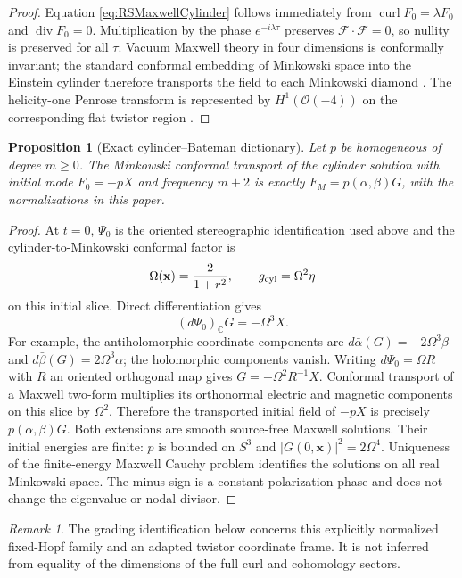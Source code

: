 \documentclass[aps,prd,reprint,nofootinbib,superscriptaddress]{revtex4-2}
\newtheorem{proposition}[theorem]{Proposition}
\theoremstyle{definition}
\theoremstyle{remark}
\newtheorem{remark}[theorem]{Remark}
\newcommand{\C}{\mathbb{C}}
\newcommand{\cO}{\mathcal{O}}
\newcommand{\Div}{\operatorname{div}}
\newcommand{\Curl}{\operatorname{curl}}
\begin{document}
\begin{proof}
Equation \eqref{eq:RSMaxwellCylinder} follows immediately from
$\Curl F_0=\lambda F_0$ and $\Div F_0=0$.  Multiplication by the phase
$e^{-i\lambda\tau}$ preserves $\mathcal F\cdot\mathcal F=0$, so nullity is preserved for all $\tau$.  Vacuum Maxwell theory in four dimensions is conformally invariant; the standard conformal embedding of Minkowski space into the Einstein cylinder therefore transports the field to each Minkowski diamond \cite{KopinskiNatario2017}.  The helicity-one Penrose transform is represented by $H^1(\cO(-4))$ on the corresponding flat twistor region \cite{WardWells1990}.
\end{proof}

\begin{proposition}[Exact cylinder--Bateman dictionary]
\label{prop:ExactCylinderBateman}
Let $p$ be homogeneous of degree $m\ge0$. The Minkowski conformal transport of the cylinder solution with initial mode $F_0=-pX$ and frequency $m+2$ is exactly $F_M=p(\alpha,\beta)G$, with the normalizations in this paper.
\end{proposition}
\begin{proof}
At $t=0$, $\Psi_0$ is the oriented stereographic identification used above and the cylinder-to-Minkowski conformal factor is
\begin{equation}
\Omega(\mathbf x)=\frac{2}{1+r^2},\qquad g_{\rm cyl}=\Omega^2\eta
\label{eq:OmegaZero}
\end{equation}
on this initial slice. Direct differentiation gives
\begin{equation}
(d\Psi_0)_{\C}G=-\Omega^3X.
\label{eq:chiZero}
\end{equation}
For example, the antiholomorphic coordinate components are
$d\bar\alpha(G)=-2\Omega^3\beta$ and
$d\bar\beta(G)=2\Omega^3\alpha$; the holomorphic components vanish. Writing $d\Psi_0=\Omega R$ with $R$ an oriented orthogonal map gives $G=-\Omega^2R^{-1}X$. Conformal transport of a Maxwell two-form multiplies its orthonormal electric and magnetic components on this slice by $\Omega^2$. Therefore the transported initial field of $-pX$ is precisely $p(\alpha,\beta)G$. Both extensions are smooth source-free Maxwell solutions. Their initial energies are finite: $p$ is bounded on $S^3$ and $|G(0,\mathbf x)|^2=2\Omega^4$. Uniqueness of the finite-energy Maxwell Cauchy problem identifies the solutions on all real Minkowski space. The minus sign is a constant polarization phase and does not change the eigenvalue or nodal divisor.
\end{proof}
\begin{remark}
The grading identification below concerns this explicitly normalized fixed-Hopf family and an adapted twistor coordinate frame. It is not inferred from equality of the dimensions of the full curl and cohomology sectors.
\end{remark}
\end{document}
